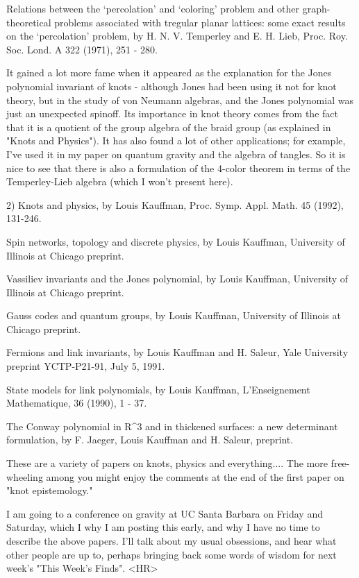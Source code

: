 Relations between the `percolation' and `coloring' problem and other
graph-theoretical problems associated with tregular planar lattices:
some exact results on the `percolation' problem, by H. N. V. Temperley
and E. H. Lieb, Proc. Roy. Soc. Lond. A 322 (1971), 251 - 280.

It gained a lot more fame when it appeared as the explanation
for the Jones polynomial invariant of knots - although Jones had been
using it not for knot theory, but in the study of von Neumann algebras,
and the Jones polynomial was just an unexpected spinoff.  Its importance
in knot theory comes from the fact that it is a quotient of the group
algebra of the braid group (as explained in "Knots and Physics").  
It has also found a lot of other applications; for example, I've used it in
my paper on quantum gravity and the algebra of tangles.  So it is nice to 
see that there is also a formulation of the 4-color theorem in terms of
the Temperley-Lieb algebra (which I won't present here).

2)  Knots and physics, by Louis Kauffman, Proc. Symp. Appl. Math. 45
(1992), 131-246.

Spin networks, topology and discrete physics, by Louis Kauffman, 
University of Illinois at Chicago preprint.  

Vassiliev invariants and the Jones polynomial, by Louis Kauffman,
University of Illinois at Chicago preprint.  

Gauss codes and quantum groups, by Louis Kauffman, University of
Illinois at Chicago preprint.   

Fermions and link invariants, by  Louis Kauffman
and H. Saleur, Yale University preprint YCTP-P21-91, July 5, 1991.

State models for link polynomials, by Louis Kauffman, L'Enseignement
Mathematique, 36 (1990), 1 - 37.

The Conway polynomial in R^3 and in thickened surfaces: a new
determinant formulation, by F. Jaeger, Louis Kauffman
and H. Saleur, preprint.  


These are a variety of papers on knots, physics and everything.... The
more free-wheeling among you might enjoy the comments at the end of the
first paper on "knot epistemology."

I am going to a conference on gravity at UC Santa Barbara on
Friday and Saturday, which I why I am posting this early, and why I have
no time to describe the above papers.   I'll talk about my usual
obsessions, and hear what other people are up to, perhaps bringing back
some words of wisdom for next week's "This Week's Finds".
<HR>



